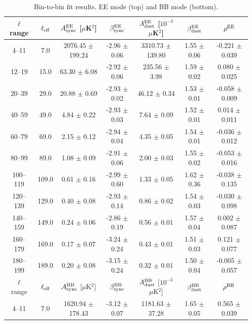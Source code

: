 \begin{table}[htbp]
\centering
\caption{Bin-to-bin fit results. EE mode (top) and BB mode (bottom).}
\label{tab:bin_to_bin_results_sim_bin4-199}
\begin{tabular}{c c c c c c c}
\hline\hline
$\ell$ range & $\ell_{\rm eff}$ & $A^{\rm EE}_{\rm sync}$ [$\mu$K$^2$] & $\beta^{\rm EE}_{\rm sync}$ & $A^{\rm EE}_{\rm dust}$ [$10^{-3}$ $\mu$K$^2$] & $\beta^{\rm EE}_{\rm dust}$ & $\rho^{\rm EE}$ \\
\hline
4--11 & 7.0 & 2076.45 $\pm$ 199.24 & -2.96 $\pm$ 0.06 & 3310.73 $\pm$ 139.80 & 1.55 $\pm$ 0.06 & -0.221 $\pm$ 0.039 \\
12--19 & 15.0 & 63.30 $\pm$ 6.08 & -2.92 $\pm$ 0.06 & 235.56 $\pm$ 3.98 & 1.59 $\pm$ 0.02 & 0.080 $\pm$ 0.025 \\
20--39 & 29.0 & 20.88 $\pm$ 0.69 & -2.93 $\pm$ 0.02 & 46.12 $\pm$ 0.34 & 1.53 $\pm$ 0.01 & -0.058 $\pm$ 0.009 \\
40--59 & 49.0 & 4.84 $\pm$ 0.22 & -2.93 $\pm$ 0.03 & 7.64 $\pm$ 0.09 & 1.52 $\pm$ 0.01 & 0.014 $\pm$ 0.011 \\
60--79 & 69.0 & 2.15 $\pm$ 0.12 & -2.94 $\pm$ 0.04 & 4.35 $\pm$ 0.05 & 1.54 $\pm$ 0.01 & -0.036 $\pm$ 0.012 \\
80--99 & 89.0 & 1.08 $\pm$ 0.09 & -2.91 $\pm$ 0.06 & 2.00 $\pm$ 0.03 & 1.55 $\pm$ 0.02 & -0.053 $\pm$ 0.016 \\
100--119 & 109.0 & 0.61 $\pm$ 0.16 & -2.99 $\pm$ 0.60 & 1.33 $\pm$ 0.05 & 1.62 $\pm$ 0.36 & -0.038 $\pm$ 0.135 \\
120--139 & 129.0 & 0.40 $\pm$ 0.08 & -2.93 $\pm$ 0.14 & 0.86 $\pm$ 0.02 & 1.54 $\pm$ 0.03 & -0.030 $\pm$ 0.098 \\
140--159 & 149.0 & 0.24 $\pm$ 0.06 & -2.86 $\pm$ 0.19 & 0.56 $\pm$ 0.01 & 1.57 $\pm$ 0.04 & 0.002 $\pm$ 0.087 \\
160--179 & 169.0 & 0.17 $\pm$ 0.07 & -3.24 $\pm$ 0.24 & 0.43 $\pm$ 0.01 & 1.51 $\pm$ 0.03 & 0.121 $\pm$ 0.077 \\
180--199 & 189.0 & 0.20 $\pm$ 0.08 & -3.15 $\pm$ 0.24 & 0.32 $\pm$ 0.01 & 1.50 $\pm$ 0.04 & -0.005 $\pm$ 0.057 \\
\hline
$\ell$ range & $\ell_{\rm eff}$ & $A^{\rm BB}_{\rm sync}$ [$\mu$K$^2$] & $\beta^{\rm BB}_{\rm sync}$ & $A^{\rm BB}_{\rm dust}$ [$10^{-3}$ $\mu$K$^2$] & $\beta^{\rm BB}_{\rm dust}$ & $\rho^{\rm BB}$ \\
\hline
4--11 & 7.0 & 1620.94 $\pm$ 178.43 & -3.12 $\pm$ 0.07 & 1181.63 $\pm$ 37.28 & 1.65 $\pm$ 0.05 & 0.565 $\pm$ 0.039 \\

\end{tabular}
\end{table}
